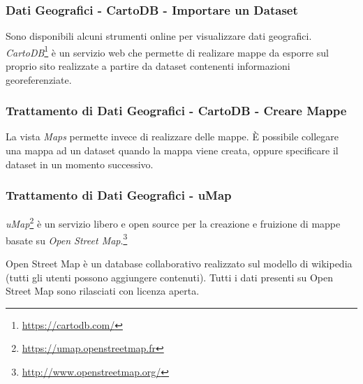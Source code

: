 \documentclass[8pt]{beamer}
\begin{document}
\begin{frame}
 \frametitle{Dati Geografici - CartoDB - Importare un Dataset}
 Sono disponibili alcuni strumenti online per visualizzare dati geografici.
 \emph{CartoDB}\footnote{\url{https://cartodb.com/}} \`e un servizio web che permette di realizare mappe da esporre sul
 proprio sito realizzate a partire da dataset contenenti informazioni georeferenziate.
 \vspace{\baselineskip}

 \vspace{\baselineskip}
 
\end{frame}

\begin{frame}
 \frametitle{Trattamento di Dati Geografici - CartoDB - Creare Mappe}
 La vista \emph{Maps} permette invece di realizzare delle mappe. \`E possibile
 collegare una mappa ad un dataset quando la mappa viene creata, oppure 
 specificare il dataset in un momento successivo.
 \vspace{\baselineskip}
 

 \vspace{\baselineskip}
 
\end{frame}

\begin{frame}
 \frametitle{Trattamento di Dati Geografici - uMap}

 \emph{uMap}\footnote{\url{https://umap.openstreetmap.fr}} \`e un servizio
 libero e open source per la creazione e fruizione di mappe basate su
 \emph{Open Street Map}.\footnote{\url{http://www.openstreetmap.org/}}
 \vspace{\baselineskip}

 Open Street Map \`e un database collaborativo realizzato sul modello di
 wikipedia (tutti gli utenti possono aggiungere contenuti). Tutti i dati 
 presenti su Open Street Map sono rilasciati con licenza aperta.
\end{frame}
 
\end{document}
